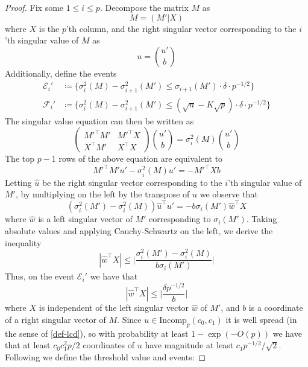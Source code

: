 \documentclass[11pt]{article}
\numberwithin{equation}{section}
\theoremstyle{remark}
\newcommand{\Incomp}{\mathrm{Incomp}}
\newcommand{\event}{\mathcal{E}}
\begin{document}
\begin{proof}
    Fix some $1 \leq i \leq p$. Decompose the matrix $M$ as $$M = (M'| X)$$ where $X$ is the $p$'th column, and the right singular vector corresponding to the $i$'th singular value of $M$ as 
    $$
    u = \binom{u'}{b}
    $$
    Additionally, define the events
    \begin{align*}
        \event_i' &\coloneqq \{ \sigma_i^2(M) - \sigma_{i + 1}^2(M') \leq \sigma_{i + 1}(M') \cdot \delta \cdot p^{-1/2} \} \\
        \mathcal{F}_i' &\coloneqq \{ \sigma_i^2(M) - \sigma_{i + 1}^2(M') \leq (\sqrt{n} - K\sqrt{p}) \cdot \delta \cdot p^{-1/2} \}
    \end{align*}
    The singular value equation can then be written as 
    \begin{equation*}
        \begin{pmatrix}
            M'^\top M' & M'^\top X \\
            X^\top M' & X^\top  X
        \end{pmatrix}
        \binom{u'}{b}
        = \sigma_i^2(M) \binom{u'}{b}
    \end{equation*}
    The top $p - 1$ rows of the above equation are equivalent to 
    \begin{equation*}
        M'^\top M'u' - \sigma_i^2(M)u'  = - M'^\top X b
    \end{equation*}
    Letting $\hat{u}$ be the right singular vector corresponding to the $i$'th singular value of $M'$, by multiplying on the left by the transpose of $\hat{u}$ we observe that
    \begin{equation*}
        (\sigma_i^2(M') - \sigma_i^2(M))\hat{u}^\top  u' = - b \sigma_i(M')\hat{w}^\top  X
    \end{equation*}
    where $\hat{w}$ is a left singular vector of $M'$ corresponding to $\sigma_i(M')$. Taking absolute values and applying Cauchy-Schwartz on the left, we derive the inequality
    \begin{equation*}
        |\hat{w}^\top  X| \leq \bigg| \frac{\sigma_i^2(M') - \sigma_i^2(M)}{b\sigma_i(M')} \bigg|
    \end{equation*}
    Thus, on the event $\event_i'$ we have that
    \begin{equation*}
         |\hat{w}^\top  X| \leq \bigg| \frac{\delta p^{-1/2}}{b} \bigg|
    \end{equation*}
    where $X$ is independent of the left singular vector $\hat{w}$ of $M'$, and $b$ is a coordinate of a right singular vector of $M$. Since $u \in \Incomp_p(c_0, c_1)$ it is well spread (in the sense of \cref{def-lcd}), so with probability at least $1 - \exp(-O(p))$ we have that at least $c_0c_1^2 p/2$ coordinates of $u$ have magnitude at least $c_1 p^{-1/2}/\sqrt{2}$. Following \cite{christoffersen2025gaps} we define the threshold value and events: 

\end{proof}
\end{document}
